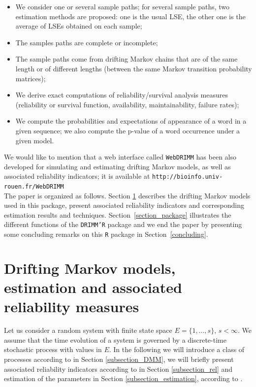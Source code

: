 \documentclass[article,nojss]{jss}\usepackage[]{graphicx}\usepackage[]{color}
\begin{document}
\begin{itemize}
\item We consider one or several sample paths; for several sample paths, two estimation methods are proposed: one is the usual LSE, the other one is the average of LSEs obtained on each sample;
\item The samples paths are complete or incomplete;
\item The sample paths come from drifting Markov chains that are of the same length or of different lengths (between the same Markov transition probability matrices);
\item We derive exact computations of reliability/survival analysis measures (reliability or survival function, availability, maintainability, failure rates);
\item We compute the  probabilities and expectations of appearance of a word in a given sequence; we also compute the p-value of a word occurrence under a given model.
\end{itemize}

We would like to mention that a web interface called {\tt WebDRIMM} has been also developed \citep[cf.][]{Kom2018} for simulating and estimating drifting Markov models, as well as associated reliability indicators; it is available at \verb|http://bioinfo.univ-rouen.fr/WebDRIMM|\\

The paper is organized as follows. Section \ref{section_DMM} describes the drifting Markov models used in this package, present associated reliability indicators and corresponding estimation results and techniques. Section~\ref{section_package} illustrates the different functions of the {\tt  DRIMM'R} package and we end the paper by presenting some concluding remarks on this {\tt R} package in Section~\ref{concluding}.

\section{Drifting Markov models, estimation and associated reliability measures} \label{section_DMM}

Let us consider a random system with finite state space $E=\{1,\ldots, s\}$, $s < \infty.$ We assume that the time evolution of a system is governed by a discrete-time stochastic process with values in $E.$ In the following we will introduce a class of processes according to \citet{Ver08}  in Section \ref{subsection_DMM}, we will briefly present associated reliability indicators  according to \citet{BaVe2018} in Section \ref{subsection_rel} and estimation of the parameters in Section \ref{subsection_estimation}, according to \citet{Ver08,BaVe2018}.
\end{document}

